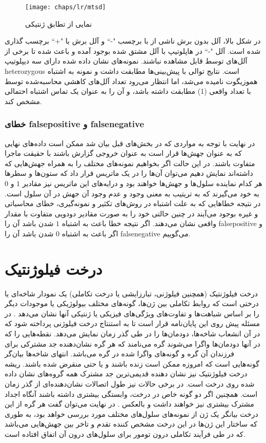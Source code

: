 \begin{figure}[!ht]
	\centerline{\texttt{[image: chaps/lr/mtsd]}}
	\caption{نمایی از تطابق ژنتیکی}
	\label{fig:ch_lr:mtsd}
\end{figure}

در شکل بالا، آلل  بدون برش ناشی از  با برچسب "-`` و آلل برش با "+`` برچسب گذاری شده است. آلل "-`` در هاپلوتیپ با آلل  مشتق شده بوجود آمده و باعث شده تا برخی از آلل‌های  توسط  قابل مشاهده نباشند. نمونه‌های نشان داده شده دارای سه دیپلوتیپ \gls{heterozygous} است. نتایج توالی با پیش‌بینی‌ها مطابقت داشت و نمونه  به اشتباه هموزیگوت نامیده می‌شد، اما انتظار می‌رود تعداد آلل‌های کاهشی محاسبه‌شده توسط  با تعداد واقعی (1) مطابقت داشته باشد، و آن را به عنوان یک تماس اشتباه احتمالی مشخص کند.

\subsubsection{خطای \gls{falsepositive} و \gls{falsenegative}}
در نهایت با توجه به مواردی که در بخش‌های قبل بیان شد ممکن است داده‌های نهایی که به عنوان جهش‌ها قرار است به عنوان خروجی گزارش باشند با حقیقت ماجرا متفاوت باشند. در این حالت اگر بخواهیم نمونه‌های مختلف را به همراه جهش‌هایی که داشته‌اند نمایش دهیم می‌توان آن‌ها را در یک ماتریس قرار داد که ستون‌ها و سطرها هر کدام نماینده سلول‌ها و جهش‌ها خواهند بود و درایه‌های این ماتریس نیز مقادیر $1$ و $0$ به خود می‌گیرند که به تریتیب به معنی وجود و عدم وجود آن جهش در آن سلول است. در نتیجه خطاهایی که به علت اشتباه در روش‌های تکثیر و نمونه‌گیری، خطای محاسباتی و غیره بوجود می‌آیند در چنین حالتی خود را به صورت مقادیر دودویی متفاوت با مقدار واقعی نشان می‌دهند. اگر نتیجه خطا باعث به اشتباه $1$ شدن باشد آن را \gls{falsepositive} و اگر باعث به اشتباه $0$ شدن باشد آن را \gls{falsenegative} می‌گوییم.

\section{درخت فیلوژنتیک}
درخت فیلوژنتیک (همچنین فیلوژنی، تبارزایشی یا درخت تکاملی) یک نمودار شاخه‌ای یا درختی است که روابط تکاملی بین ژن‌ها، گونه‌های مختلف بیولوژیکی یا موجودات دیگر را بر اساس شباهت‌ها و تفاوت‌های ویژگی‌های فیزیکی یا ژنتیکی آنها نشان می‌دهد \cite{davis2016computing}. در مسئله پیش روی این پایان‌نامه قرار است تا به استنتاج درخت فیلوژنی پرداخته شود که در آن انشعاب شاخه‌ها، دودمان‌ها را در طی گذر زمان نمایش می‌دهد. نقطه‌هایی را که در آنها دودمان‌ها واگرا می‌شوند گره می‌نامند که هر گره نشان‌دهنده جد مشترکی برای فرزندان آن گره و گونه‌های واگرا شده در گره می‌باشد. انتهای شاخه‌ها بیان‌گر گونه‌هایی است که امروزه ممکن است زنده باشند و یا حتی منقرض شده باشند. ریشه درخت فیلوژنتیک نیز نشان دهنده قدیمی‌ترین جد مشترک همه گروه‌های نشان داده شده روی درخت است. در برخی حالات نیز طول اتصالات نشان‌دهنده‌ای از گذر زمان است. همچنین اگر دو گونه خاص در درخت، وابستگی بیشتری داشته باشند آنگاه اجداد مشترک بیشتری نیز خواهند داشت و بالعکس \cite{gori2016clustering}. در نهایت می‌توان گفت هر گره از این درخت بیانگر یک ژن از نمونه‌های سلول‌های مختلف مورد بررسی خواهد بود، به طوری که ساختار این ژن‌ها در این درخت مشخص کننده تقدم و تاخر بین جهش‌هایی می‌باشد که در طی فرآیند تکاملی درون تومور برای سلول‌های درون آن اتفاق افتاده است.

